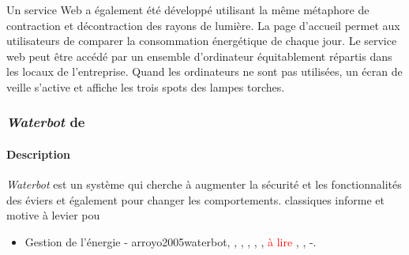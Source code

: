 \documentclass[10pt,a5paper,twoside]{article}
\begin{document}
Un service Web a également été développé utilisant la même métaphore de
contraction et décontraction des rayons de lumière. La page d'accueil
permet aux utilisateurs de comparer la consommation énergétique de
chaque jour. Le service web peut être accédé par un ensemble
d'ordinateur équitablement répartis dans les locaux de l'entreprise.
Quand les ordinateurs ne sont pas utilisées, un écran de veille s'active
et affiche les trois spots des lampes torches.

\subsubsection{\emph{Waterbot} de
\citet{arroyo2005waterbot}}\label{waterbot-de-arroyo2005waterbot}

\paragraph{Description}\label{description-11}

\emph{Waterbot} est un système qui cherche à augmenter la sécurité et
les fonctionnalités des éviers et également pour changer les
comportements. classiques informe et motive à levier pou

\begin{itemize}
\itemsep1pt\parskip0pt
\item
  Gestion de l'énergie - arroyo2005waterbot, \citet{kyoto2005wattson},
  \citet{jonsson2010watt}, \citet{ernevi2005energy},
  \citet{gyllensward2006visualizing},
  \citet{lagerkvist2016disappearing}, \textcolor{red}{à lire}
  \citet{rogers2010ambient}, \citet{kuznetsov2010upstream},
  \citet{valkanova2013reveal} -.
\end{itemize}

\newpage


\end{document}
